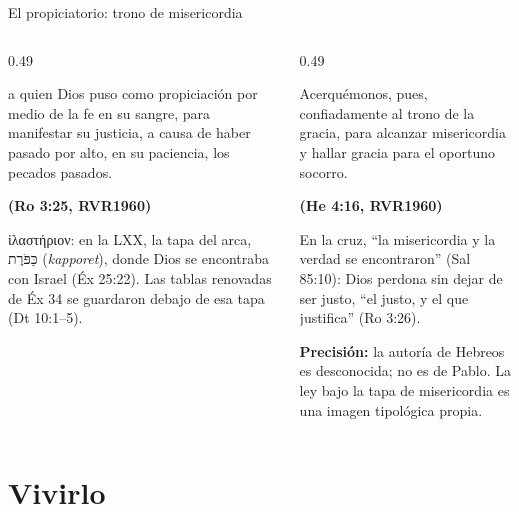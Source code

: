 \documentclass[hyperref={bookmarks=false},aspectratio=169]{beamer}
\newcommand{\heb}[1]{\mbox{\foreignlanguage{hebrew}{#1}}}
\newcommand{\grc}[1]{\foreignlanguage{ancientgreek}{#1}}
\newcommand{\fuente}[1]{\par\hfill{\upshape\bfseries\footnotesize\textcolor{azul}{#1}}}
\newcommand{\precision}[1]{{\footnotesize\color{gris}\textbf{Precisión:} #1}}
\begin{document}
\begin{frame}{El propiciatorio: trono de misericordia}
\begin{columns}[t,onlytextwidth]
\begin{column}{0.49\textwidth}
\begin{cita}a quien Dios puso como propiciación por medio de la fe en su sangre, para manifestar su justicia, a causa de haber pasado por alto, en su paciencia, los pecados pasados.\fuente{(Ro 3:25, RVR1960)}\end{cita}
\scriptsize\grc{ἱλαστήριον}: en la LXX, la tapa del arca, \heb{כַּפֹּרֶת} (\emph{kapporet}), donde Dios se encontraba con Israel (Éx 25:22). Las tablas renovadas de Éx 34 se guardaron debajo de esa tapa (Dt 10:1--5).
\end{column}
\begin{column}{0.49\textwidth}
\begin{cita}Acerquémonos, pues, confiadamente al trono de la gracia, para alcanzar misericordia y hallar gracia para el oportuno socorro.\fuente{(He 4:16, RVR1960)}\end{cita}
\small En la cruz, ``la misericordia y la verdad se encontraron'' (Sal 85:10): Dios perdona sin dejar de ser justo, ``el justo, y el que justifica'' (Ro 3:26).\par\smallskip
\precision{la autoría de Hebreos es desconocida; no es de Pablo. La ley bajo la tapa de misericordia es una imagen tipológica propia.}
\end{column}
\end{columns}
\end{frame}

\section{Vivirlo}
\end{document}
